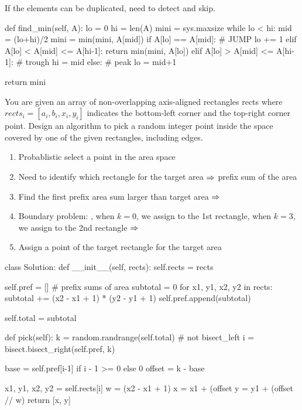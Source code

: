 If the elements can be duplicated, need to detect and skip. 
\begin{python}
def find_min(self, A):
    lo = 0
    hi = len(A)
    mini = sys.maxsize
    while lo < hi:
        mid = (lo+hi)/2
        mini = min(mini, A[mid])
        if A[lo] == A[mid]:  # JUMP
            lo += 1
        elif A[lo] < A[mid] <= A[hi-1]:
            return min(mini, A[lo])
        elif A[lo] > A[mid] <= A[hi-1]:  # trough
            hi = mid
        else:  # peak
            lo = mid+1

    return mini
\end{python}
 You are given an array of non-overlapping axis-aligned rectangles rects where $rects_i = [a_i, b_i, x_i, y_i]$ indicates the bottom-left corner and the top-right corner point. Design an algorithm to pick a random integer point inside the space covered by one of the given rectangles, including edges.
\begin{enumerate}
\item Probablistic select a point in the area space
\item Need to identify which rectangle for the target area $\Rightarrow$ prefix sum of the area
\item Find the first prefix area sum larger than target area $\Rightarrow$ 
\item Boundary problem: , when $k=0$, we assign to the 1st rectangle, when $k=3$, we assign to the 2nd rectangle $\Rightarrow$ 
\item Assign a point of the target rectangle for the target area 
\end{enumerate}
\begin{python}
class Solution:
  def __init__(self, rects):
    self.rects = rects

    self.pref = []  # prefix sums of area
    subtotal = 0
    for x1, y1, x2, y2 in rects:
      subtotal += (x2 - x1 + 1) * (y2 - y1 + 1)
      self.pref.append(subtotal)

    self.total = subtotal

  def pick(self):
    k = random.randrange(self.total)
    # not bisect_left
    i = bisect.bisect_right(self.pref, k)

    base = self.pref[i-1] if i - 1 >= 0 else 0
    offset = k - base

    x1, y1, x2, y2 = self.rects[i]
    w = (x2 - x1 + 1)
    x = x1 + (offset %
    y = y1 + (offset // w)
    return [x, y]
\end{python}

